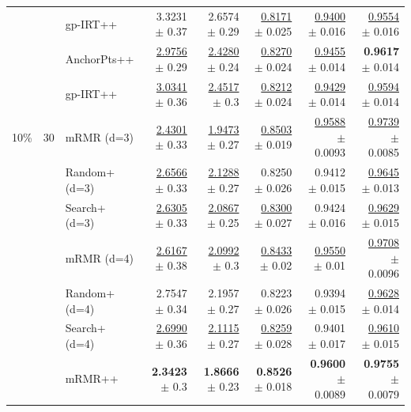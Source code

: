 \begin{longtable}{llp{}rrrrr}
 &  & gp-IRT++ & 3.3231 {\scriptsize $\pm$ 0.37} & 2.6574 {\scriptsize $\pm$ 0.29} & \underline{0.8171} {\scriptsize $\pm$ 0.025} & \underline{0.9400} {\scriptsize $\pm$ 0.016} & \underline{0.9554} {\scriptsize $\pm$ 0.016} \\
 &  & AnchorPts++ & \underline{2.9756} {\scriptsize $\pm$ 0.29} & \underline{2.4280} {\scriptsize $\pm$ 0.24} & \underline{0.8270} {\scriptsize $\pm$ 0.024} & \underline{0.9455} {\scriptsize $\pm$ 0.014} & \textbf{0.9617} {\scriptsize $\pm$ 0.014} \\
 &  & gp-IRT++ & \underline{3.0341} {\scriptsize $\pm$ 0.36} & \underline{2.4517} {\scriptsize $\pm$ 0.3} & \underline{0.8212} {\scriptsize $\pm$ 0.024} & \underline{0.9429} {\scriptsize $\pm$ 0.014} & \underline{0.9594} {\scriptsize $\pm$ 0.014} \\
\midrule
10\% & 30 & mRMR (d=3) & \underline{2.4301} {\scriptsize $\pm$ 0.33} & \underline{1.9473} {\scriptsize $\pm$ 0.27} & \underline{0.8503} {\scriptsize $\pm$ 0.019} & \underline{0.9588} {\scriptsize $\pm$ 0.0093} & \underline{0.9739} {\scriptsize $\pm$ 0.0085} \\
 &  & Random+ (d=3) & \underline{2.6566} {\scriptsize $\pm$ 0.33} & \underline{2.1288} {\scriptsize $\pm$ 0.27} & 0.8250 {\scriptsize $\pm$ 0.026} & 0.9412 {\scriptsize $\pm$ 0.015} & \underline{0.9645} {\scriptsize $\pm$ 0.013} \\
 &  & Search+ (d=3) & \underline{2.6305} {\scriptsize $\pm$ 0.33} & \underline{2.0867} {\scriptsize $\pm$ 0.25} & \underline{0.8300} {\scriptsize $\pm$ 0.027} & 0.9424 {\scriptsize $\pm$ 0.016} & \underline{0.9629} {\scriptsize $\pm$ 0.015} \\
 &  & mRMR (d=4) & \underline{2.6167} {\scriptsize $\pm$ 0.38} & \underline{2.0992} {\scriptsize $\pm$ 0.3} & \underline{0.8433} {\scriptsize $\pm$ 0.02} & \underline{0.9550} {\scriptsize $\pm$ 0.01} & \underline{0.9708} {\scriptsize $\pm$ 0.0096} \\
 &  & Random+ (d=4) & 2.7547 {\scriptsize $\pm$ 0.34} & 2.1957 {\scriptsize $\pm$ 0.27} & 0.8223 {\scriptsize $\pm$ 0.026} & 0.9394 {\scriptsize $\pm$ 0.015} & \underline{0.9628} {\scriptsize $\pm$ 0.014} \\
 &  & Search+ (d=4) & \underline{2.6990} {\scriptsize $\pm$ 0.36} & \underline{2.1115} {\scriptsize $\pm$ 0.27} & \underline{0.8259} {\scriptsize $\pm$ 0.028} & 0.9401 {\scriptsize $\pm$ 0.017} & \underline{0.9610} {\scriptsize $\pm$ 0.015} \\
 &  & mRMR++ & \textbf{2.3423} {\scriptsize $\pm$ 0.3} & \textbf{1.8666} {\scriptsize $\pm$ 0.23} & \textbf{0.8526} {\scriptsize $\pm$ 0.018} & \textbf{0.9600} {\scriptsize $\pm$ 0.0089} & \textbf{0.9755} {\scriptsize $\pm$ 0.0079} \\

\end{longtable}
